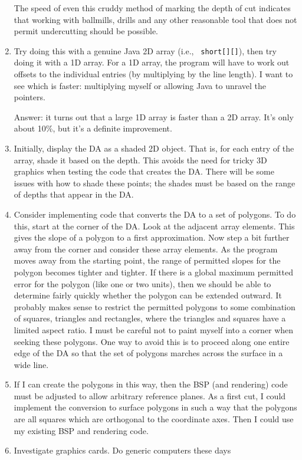 \documentclass[titlepage,oneside,10pt]{article}
\begin{document}
\begin{enumerate}
The speed of even this cruddy method of marking the depth of cut
indicates that working with ballmills, drills and any other reasonable
tool that does not permit undercutting should be possible.
\item Try doing this with a genuine Java 2D array (i.e., {\tt
  short[][]}), then try doing it with a 1D array. For a 1D array, the
  program will have to work out offsets to the individual entries (by
  multiplying by the line length). I want to see which is faster:
  multiplying myself or allowing Java to unravel the pointers.

Answer: it turns out that a large 1D array is faster than a 2D
array. It's only about 10\%, but it's a definite improvement.
\item Initially, display the DA as a shaded 2D object. That is, for
  each entry of the array, shade it based on the depth. This avoids
  the need for tricky 3D graphics when testing the code that creates
  the DA. There will be some issues with how to shade these points;
  the shades must be based on the range of depths that appear in the
  DA.
\item Consider implementing code that converts the DA to a set of
  polygons. To do this, start at the corner of the DA. Look at the
  adjacent array elements. This gives the slope of a polygon to a
  first approximation. Now step a bit further away from the corner and
  consider these array elements. As the program moves away from the
  starting point, the range of permitted slopes for the polygon
  becomes tighter and tighter. If there is a global maximum permitted
  error for the polygon (like one or two units), then we should be
  able to determine fairly quickly whether the polygon can be extended
  outward. It probably makes sense to restrict the permitted polygons
  to some combination of squares, triangles and rectangles, where the
  triangles and squares have a limited aspect ratio. I must be careful
  not to paint myself into a corner when seeking these polygons. One
  way to avoid this is to proceed along one entire edge of the DA so
  that the set of polygons marches across the surface in a wide line.
\item If I can create the polygons in this way, then the BSP (and
  rendering) code must be adjusted to allow arbitrary reference
  planes. As a first cut, I could implement the conversion to surface
  polygons in such a way that the polygons are all squares which are
  orthogonal to the coordinate axes. Then I could use my existing BSP
  and rendering code.
\item Investigate graphics cards. Do generic computers these days

\end{enumerate}
\end{document}
